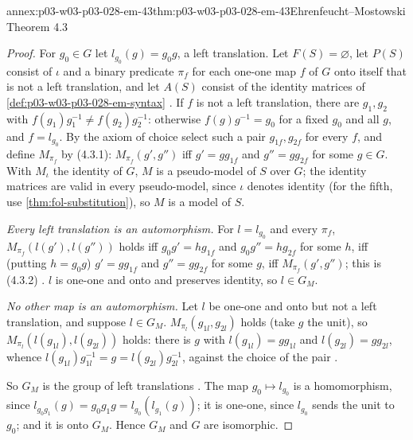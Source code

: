 \begin{annexitem}{annex:p03-w03-p03-028-em-43}{thm:p03-w03-p03-028-em-43}{Ehrenfeucht--Mostowski Theorem 4.3}
\begin{proof}
For \(g_0\in G\) let \(l_{g_0}(g)=g_0g\), a left translation.  Let
\(F(S)=\varnothing\), let \(P(S)\) consist of \(\iota\) and a binary predicate
\(\pi_f\) for each one-one map \(f\) of \(G\) onto itself that is not a left
translation, and let \(A(S)\) consist of the identity matrices of
\cref{def:p03-w03-p03-028-em-syntax} \cite[p.~56]{EhrenfeuchtMostowski1956}.
If \(f\) is not a left translation, there are \(g_1,g_2\) with
\(f(g_1)g_1^{-1}\neq f(g_2)g_2^{-1}\): otherwise \(f(g)g^{-1}=g_0\) for a fixed
\(g_0\) and all \(g\), and \(f=l_{g_0}\).  By the axiom of choice select such a
pair \(g_{1f},g_{2f}\) for every \(f\), and define \(M_{\pi_f}\) by (4.3.1):
\(M_{\pi_f}(g',g'')\) iff \(g'=gg_{1f}\) and \(g''=gg_{2f}\) for some
\(g\in G\).  With \(M_\iota\) the identity of \(G\), \(M\) is a pseudo-model of
\(S\) over \(G\); the identity matrices are valid in every pseudo-model, since
\(\iota\) denotes identity (for the fifth, use
\cref{thm:fol-substitution}), so \(M\) is a model of \(S\).

\emph{Every left translation is an automorphism.}  For \(l=l_{g_0}\) and every
\(\pi_f\), \(M_{\pi_f}(l(g'),l(g''))\) holds iff
\(g_0g'=hg_{1f}\) and \(g_0g''=hg_{2f}\) for some \(h\), iff (putting
\(h=g_0g\)) \(g'=gg_{1f}\) and \(g''=gg_{2f}\) for some \(g\), iff
\(M_{\pi_f}(g',g'')\); this is (4.3.2) \cite[p.~56]{EhrenfeuchtMostowski1956}.
\(l\) is one-one and onto and preserves identity, so \(l\in G_M\).

\emph{No other map is an automorphism.}  Let \(l\) be one-one and onto but not
a left translation, and suppose \(l\in G_M\).  \(M_{\pi_l}(g_{1l},g_{2l})\) holds
(take \(g\) the unit), so \(M_{\pi_l}(l(g_{1l}),l(g_{2l}))\) holds: there is
\(g\) with \(l(g_{1l})=gg_{1l}\) and \(l(g_{2l})=gg_{2l}\), whence
\(l(g_{1l})g_{1l}^{-1}=g=l(g_{2l})g_{2l}^{-1}\), against the choice of the pair
\cite[p.~56]{EhrenfeuchtMostowski1956}.

So \(G_M\) is the group of left translations
\cite[p.~57]{EhrenfeuchtMostowski1956}.  The map \(g_0\mapsto l_{g_0}\) is a
homomorphism, since \(l_{g_0g_1}(g)=g_0g_1g=l_{g_0}(l_{g_1}(g))\); it is
one-one, since \(l_{g_0}\) sends the unit to \(g_0\); and it is onto
\(G_M\).  Hence \(G_M\) and \(G\) are isomorphic.
\end{proof}
\end{annexitem}


